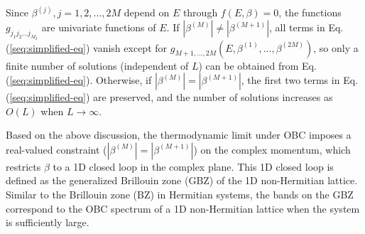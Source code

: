 Since $\beta^{(j)},j=1,2,\dots,2M$ depend on $E$ through $f\left(E,\beta\right)=0$,
the functions $g_{j_{1}j_{2}\dots j_{M_{2}}}$ are univariate functions
of $E$. If $\left|\beta^{(M)}\right|\neq\left|\beta^{(M+1)}\right|$,
all terms in Eq. (\ref{seq:simplified-eq}) vanish except for $g_{M+1,\dots,2M}\left(E,\beta^{(1)},\dots,\beta^{(2M)}\right)$,
so only a finite number of solutions (independent of $L$) can be
obtained from Eq. (\ref{seq:simplified-eq}). Otherwise, if $\left|\beta^{(M)}\right|=\left|\beta^{(M+1)}\right|$,
the first two terms in Eq. (\ref{seq:simplified-eq}) are preserved,
and the number of solutions increases as $O(L)$ when $L\rightarrow\infty$.

Based on the above discussion, the thermodynamic limit under OBC imposes
a real-valued constraint ($|\beta^{(M)}|=|\beta^{(M+1)}|$) on the
complex momentum, which restricts $\beta$ to a 1D closed loop in
the complex plane. This 1D closed loop is defined as the generalized
Brillouin zone (GBZ) of the 1D non-Hermitian lattice. Similar to the
Brillouin zone (BZ) in Hermitian systems, the bands on the GBZ correspond
to the OBC spectrum of a 1D non-Hermitian lattice when the system
is sufficiently large.

